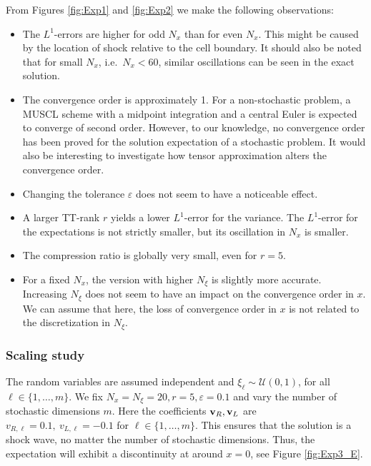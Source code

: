 \documentclass{article}
\newcommand{\bfv}{ {\bf v} }
\begin{document}
From Figures \ref{fig:Exp1} and \ref{fig:Exp2} we make the following observations:
\begin{itemize}
    \item The $L^1$-errors are higher for odd $N_x$ than for even $N_x$. 
    This might be caused by the location of shock relative  to the cell boundary. It should also be noted that for small $N_x$, i.e.~$N_x<60$, similar oscillations can be seen in the exact solution.
    \item The convergence order is approximately 1. 
    For a non-stochastic problem, a MUSCL scheme with a midpoint integration and a central Euler is expected to converge of second order.
    However, to our knowledge, no convergence order has been proved for the solution expectation of a stochastic problem. 
    It would also be interesting to investigate how tensor approximation alters the convergence order.  
    \item Changing the tolerance $\varepsilon$ does not seem to have a noticeable effect.
    \item A larger TT-rank $r$ yields a lower $L^1$-error for the variance. The $L^1$-error for the expectations is not strictly smaller, but its oscillation in $N_x$ is smaller.  
    \item The compression ratio is globally very small, even for $r=5$. %
    \item For a fixed $N_x$, the version with higher $N_\xi$ is slightly more accurate. 
    Increasing $N_\xi$ does not seem to have an impact on the convergence order in $x$.
    We can assume that here, the loss of convergence order in $x$ is not related to the discretization in $N_\xi$. 
\end{itemize}





\subsubsection{Scaling study}
The random variables are assumed independent and $\xi_\ell \sim \mathcal U(0,1)$, for all $\ell \in \{1,\dots,m\}$. 
We fix $N_x=N_\xi=20, r=5, \varepsilon=0.1$ and vary the number of stochastic dimensions $m$.
Here the coefficients $\bfv_R, \bfv_L$ are $v_{R,\ell}=0.1,~v_{L,\ell}=-0.1$ for $\ell\in\{1,\dots,m\}$. 
This ensures that the solution is a shock wave, no matter the number of stochastic dimensions. 
Thus, the expectation will exhibit a discontinuity at around $x=0$, see Figure \ref{fig:Exp3_E}.
\end{document}

